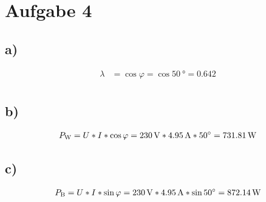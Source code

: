 \documentclass[../../document.tex]{subfiles}
\begin{document}
\section*{Aufgabe 4}

\subsection*{a)}

\begin{equation*}
    \begin{split}
        \lambda &= \cos{\varphi} = \cos{\SI{50}{\degree}} = \num{0.642}\\
    \end{split}
\end{equation*}

\subsection*{b)}

\begin{equation*}
    \begin{split}
        P_{\textrm{W}} &= U * I * \cos{\varphi} = \SI{230}{\volt} * \SI{4,95}{\ampere} * \SI{50}{\degree} = \SI{731,81}{\watt}\\
    \end{split}
\end{equation*}

\subsection*{c)}

\begin{equation*}
    \begin{split}
        P_{\textrm{B}} &= U * I * \sin{\varphi} = \SI{230}{\volt} * \SI{4,95}{\ampere} * \sin{\SI{50}{\degree}} = \SI{872,14}{\watt}\\
    \end{split}
\end{equation*}
\end{document}
